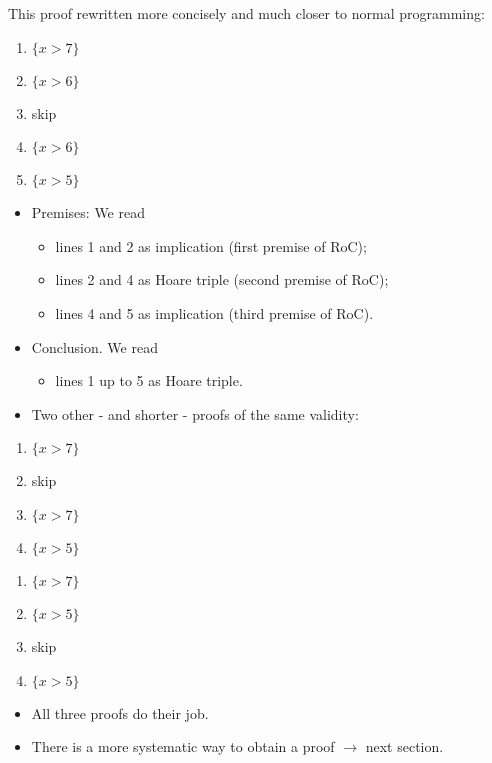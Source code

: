\begin{multicols}{2}
This proof rewritten more concisely and much closer to normal programming:
\begin{enumerate}
  \item $\{x>7\}$
  \item $\{x>6\}$
  \item skip
  \item $\{x>6\}$
  \item $\{x>5\}$
\end{enumerate}
\begin{itemize}
  \item Premises: We read
  \begin{itemize}
    \item lines 1 and 2 as implication (first premise of RoC);
    \item lines 2 and 4 as Hoare triple (second premise of RoC);
    \item lines 4 and 5 as implication (third premise of RoC).
  \end{itemize}
  \item Conclusion. We read
  \begin{itemize}
    \item lines 1 up to 5 as Hoare triple.
  \end{itemize}
  \item Two other - and shorter - proofs of the same validity:
\end{itemize}
\begin{enumerate}
  \item $\{x>7\}$
  \item skip
  \item $\{x>7\}$
  \item $\{x>5\}$
\end{enumerate}
\begin{enumerate}
  \item $\{x>7\}$
  \item $\{x>5\}$
  \item skip
  \item $\{x>5\}$
\end{enumerate}
\begin{itemize}
  \item All three proofs do their job.
  \item There is a more systematic way to obtain a proof $\rightarrow$ next section.
\end{itemize}


\end{multicols}
